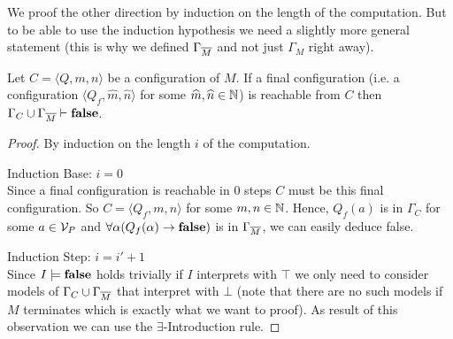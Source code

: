 We proof the other direction by induction on the length of the computation. But to be able to use the induction hypothesis we need a slightly more general statement (this is why we defined $\Gamma_{\overline{M}}$ and not just $\Gamma_M$ right away).
\begin{claim}\label{cla.18}
	Let $C=\langle Q,m,n\rangle$ be a configuration of $M$. If a final configuration (i.e. a configuration $\langle Q_f,\widehat{m},\widehat{n}\rangle$ for some $\widehat{m},\widehat{n}\in\mathbb{N}$) is reachable from $C$ then $\Gamma_C\cup\Gamma_{\overline{M}}\vdash\textbf{false}$.
\end{claim}
\begin{proof} By induction on the length $i$ of the computation.
	
	Induction Base: $i=0$\\
	Since a final configuration is reachable in 0 steps $C$ must be this final configuration. So $C=\langle Q_f,m,n\rangle$ for some $m,n\in\mathbb{N}$. Hence, $Q_f(a)$ is in $\Gamma_C$ for some $a\in\mathcal{V}_P$ and $\forall\alpha(Q_f(\alpha)\to\textbf{false})$ is in $\Gamma_{\overline{M}}$, we can easily deduce false.
	\begin{figure}[H]
		\centering
		
	\end{figure}
	 
	Induction Step: $i= i'+1$\\
	Since $I\models\textbf{false}$ holds trivially if $I$ interprets \false{} with $\top$ we only need to consider models of $\Gamma_C\cup\Gamma_{\overline{M}}$ that interpret \false{} with $\bot$ (note that there are no such models if $M$ terminates which is exactly what we want to proof). As result of this observation we can use the $\exists$-Introduction rule.
	

\end{proof}
